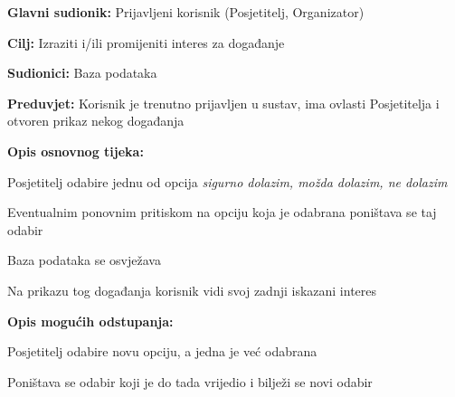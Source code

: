 					
					
					\noindent {}
					\begin{packed_item}
						
						\item \textbf{Glavni sudionik: } Prijavljeni korisnik (Posjetitelj, Organizator)
						\item  \textbf{Cilj:} Izraziti i/ili promijeniti interes za događanje
						\item  \textbf{Sudionici:} Baza podataka
						\item  \textbf{Preduvjet:} Korisnik je trenutno prijavljen u sustav, ima ovlasti Posjetitelja i otvoren prikaz nekog događanja 
						\item  \textbf{Opis osnovnog tijeka:}
						
						\item[] \begin{packed_enum}
							
							\item Posjetitelj odabire jednu od opcija \textit{sigurno dolazim, možda dolazim, ne dolazim }
							\item Eventualnim ponovnim pritiskom na opciju koja je odabrana poništava se taj odabir
							\item Baza podataka se osvježava
							\item Na prikazu tog događanja korisnik vidi svoj zadnji iskazani interes 
							
						\end{packed_enum}
						
						\item  \textbf{Opis mogućih odstupanja:}
						
						\item[] \begin{packed_item}
							
							\item[1.a] Posjetitelj odabire novu opciju, a jedna je već odabrana  
							\item[] \begin{packed_enum}
								
								\item Poništava se odabir koji je do tada vrijedio i bilježi se novi odabir
								
							\end{packed_enum}		
						\end{packed_item}
						
					\end{packed_item}
					
